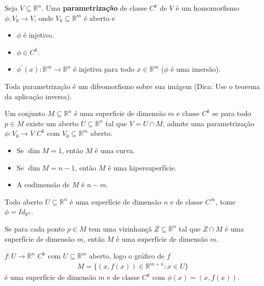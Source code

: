 \begin{definition}[Parametrização]
  Seja $V\subseteq\mathbb{R}^{n}$. Uma \textbf{parametrização} de classe $C^{k}$ de $V$ é um homomorfismo $\phi:V_0\to V$, onde $V_0\subseteq \mathbb{R}^{m}$ é aberto e
  \begin{itemize}
    \item $\phi$ é injetivo.
    \item $\phi\in C^{k}$.
    \item $\phi^{\prime}(x):\mathbb{R}^{m}\to\mathbb{R}^{n}$ é injetiva para todo $x\in\mathbb{R}^{m}$ ($\phi$ é uma imersão).
  \end{itemize}
\end{definition}
\begin{note}
  Toda parametrização é um difeomorfismo sobre sua imágem (Dica: Use o teorema da aplicação inversa).
\end{note}
\begin{definition}[Superficie]
  Um conjunto $M\subseteq \mathbb{R}^{n}$ é uma superficie de dimensão $m$ e classe $C^{k}$ se para todo $p\in M$ existe um aberto $U\subseteq\mathbb{R}^{n}$ tal que $V=U\cap M$, admite uma parametrização $\phi:V_0\to V$ $C^{k}$ com $V_0\subseteq\mathbb{R}^{m}$ aberto.
  \begin{center}
          
  \end{center}
\end{definition}
\begin{note}
  \phantom{X}
  \begin{itemize}
    \item Se $\dim M=1$, então $M$ é uma curva.
    \item Se $\dim M=n-1$, então $M$ é uma hipersuperfície.
    \item A codimensão de $M$ é $n-m$. 
  \end{itemize}
\end{note}
\begin{example}
  Todo aberto $U\subseteq\mathbb{R}^{n}$ é uma superfície de dimensão $n$ e de classe $C^{\infty}$, tome $\phi=Id_{\mathbb{R}^{n}}$.
\end{example}
\begin{example}
  Se para cada ponto $p\in M$ tem uma vizinhançã $Z\subseteq\mathbb{R}^{n}$ tal que $Z\cap M$ é uma superfície de dimensão $m$, então $M$ é uma superfície de dimensão $m$. 
\end{example}
\begin{example}
  $f:U\to\mathbb{R}^{n}$ $C^{k}$ com $U\subseteq \mathbb{R}^{m}$ aberto, logo o gráfico de $f$
  \begin{align*}
    M=\{(x,f(x))\in\mathbb{R}^{m+n}:x\in U\}
  \end{align*}
  é uma superfície de dimensão $m$ e de classe $C^{k}$ com $\phi(x)=(x,f(x))$. 
\end{example}
